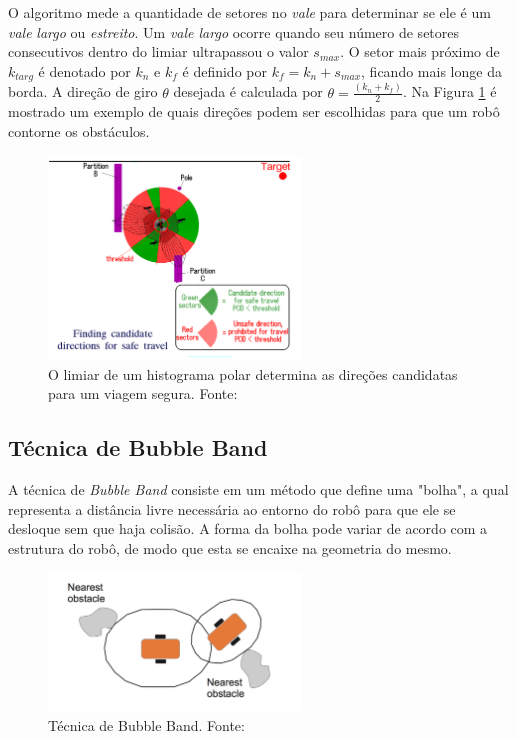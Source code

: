 O algoritmo mede a quantidade de setores no \textit{vale} para determinar se ele é um \textit{vale} \textit{largo} ou \textit{estreito}. Um \textit{vale largo} ocorre quando seu número de setores consecutivos dentro do limiar ultrapassou o valor $s_{max}$. O setor mais próximo de $k_{targ}$ é denotado por $k_{n}$ e $k_{f}$ é definido por $k_{f} = k_{n}+s_{max}$, ficando mais longe da borda. A direção de giro $\theta$ desejada é calculada por $\theta = \frac{(k_{n} + k_{f})}{2}$. Na Figura \ref{fig:cand_direc} é mostrado um exemplo de quais direções podem ser escolhidas para que um robô contorne os obstáculos. 

\begin{figure}[H]
    \centering
    \includegraphics[width=0.6\textwidth]{img/candidate_directions}
    \caption{O limiar de um histograma polar determina as direções candidatas para um viagem segura. Fonte: \cite{c1}}
    \label{fig:cand_direc}
\end{figure}

\subsection{Técnica de Bubble Band}
\label{sec:bubbleband}

A técnica de \textit{Bubble Band} consiste em um método que define uma "bolha", a qual representa a distância livre necessária ao entorno do robô para que ele se desloque sem que haja colisão. A forma da bolha pode variar de acordo com a estrutura do robô, de modo que esta se encaixe na geometria do mesmo.

\begin{figure}[H]
    \centering
    \includegraphics[width=0.6\textwidth]{img/bubble}
    \caption{Técnica de Bubble Band. Fonte: \cite{c2}}
    \label{fig:bubble}
\end{figure}
